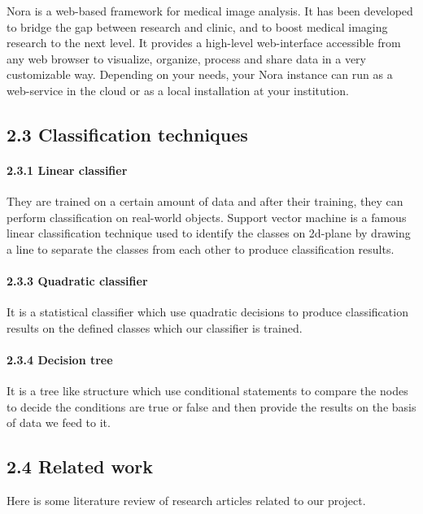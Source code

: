 \documentclass{article} %
\begin{document}
\noindent Nora is a web-based framework for medical image analysis. It has been developed to bridge the gap between research and clinic, and to boost medical imaging research to the next level. It provides a high-level web-interface accessible from any web browser to visualize, organize, process and share data in a very customizable way. Depending on your needs, your Nora instance can run as a web-service in the cloud or as a local installation at your institution.

\noindent 
\subsection{2.3 Classification techniques}

\noindent 
\paragraph{2.3.1 Linear classifier}

\noindent They are trained on a certain amount of data and after their training, they can perform classification on real-world objects. Support vector machine is a famous linear classification technique used to identify the classes on 2d-plane by drawing a line to separate the classes from each other to produce classification results.

\noindent 
\paragraph{2.3.3 Quadratic classifier}

\noindent It is a statistical classifier which use quadratic decisions to produce classification results on the defined classes which our classifier is trained.

\noindent 
\paragraph{2.3.4 Decision tree}

\noindent It is a tree like structure which use conditional statements to compare the nodes to decide the conditions are true or false and then provide the results on the basis of data we feed to it.

\noindent 
\subsection{2.4 Related work}

\noindent Here is some literature review of research articles related to our project.
\end{document}
